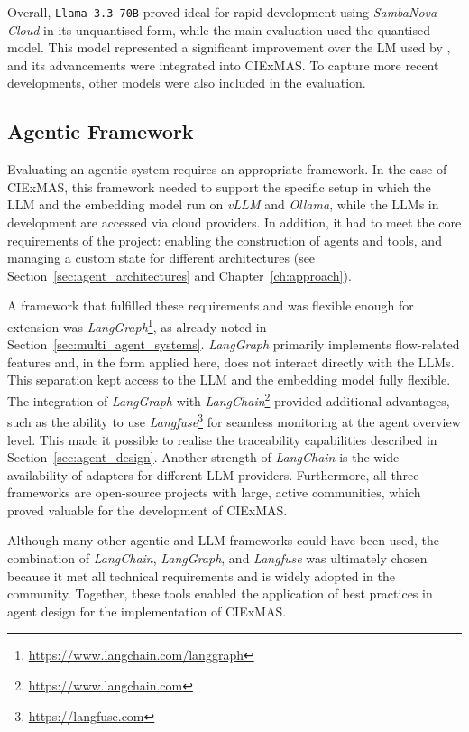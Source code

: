 \documentclass[a4paper,oneside,bibliography=totoc]{scrbook}
\begin{document}
Overall, \texttt{Llama-3.3-70B} proved ideal for rapid development using \textit{SambaNova Cloud} in its unquantised form, while the main evaluation used the quantised model. This model represented a significant improvement over the \ac{LM} used by \citet{Josifoski2023}, and its advancements were integrated into CIExMAS. To capture more recent developments, other models were also included in the evaluation.

\subsection{Agentic Framework}
\label{subsec:agentic_framework}

Evaluating an agentic system requires an appropriate framework. In the case of CIExMAS, this framework needed to support the specific setup in which the \ac{LLM} and the embedding model run on \textit{vLLM} and \textit{Ollama}, while the \acp{LLM} in development are accessed via cloud providers. In addition, it had to meet the core requirements of the project: enabling the construction of agents and tools, and managing a custom state for different architectures (see Section~\ref{sec:agent_architectures} and Chapter~\ref{ch:approach}).

A framework that fulfilled these requirements and was flexible enough for extension was \textit{LangGraph}\footnote{\url{https://www.langchain.com/langgraph}}, as already noted in Section~\ref{sec:multi_agent_systems}. \textit{LangGraph} primarily implements flow-related features and, in the form applied here, does not interact directly with the \acp{LLM}. This separation kept access to the \ac{LLM} and the embedding model fully flexible. The integration of \textit{LangGraph} with \textit{LangChain}\footnote{\url{https://www.langchain.com}} provided additional advantages, such as the ability to use \textit{Langfuse}\footnote{\url{https://langfuse.com}} for seamless monitoring at the agent overview level. This made it possible to realise the traceability capabilities described in Section~\ref{sec:agent_design}. Another strength of \textit{LangChain} is the wide availability of adapters for different \ac{LLM} providers. Furthermore, all three frameworks are open-source projects with large, active communities, which proved valuable for the development of CIExMAS.

Although many other agentic and \ac{LLM} frameworks could have been used, the combination of \textit{LangChain}, \textit{LangGraph}, and \textit{Langfuse} was ultimately chosen because it met all technical requirements and is widely adopted in the community. Together, these tools enabled the application of best practices in agent design for the implementation of CIExMAS.
\end{document}
